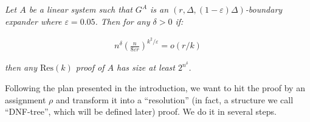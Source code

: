 \emph{Let $A$ be a linear system such that $G^{A}$ is an $(r,\Delta,(1-\varepsilon)\Delta)$-boundary
expander where $\varepsilon=0.05$. Then for any $\delta>0$ if:}\par


\[\begin{gathered}
n^{\delta}\left(\frac{n}{8\varepsilon r}\right)^{k^{2}/\varepsilon}=o(r/k)
\end{gathered}\]


\emph{then any $\mathrm{Res}(k)$ proof of $A$ has size at least $2^{n^{\delta}}$.}\par






Following the plan presented in the introduction, we want to hit the proof by an assignment $\rho$
and transform it into a “resolution” (in fact, a structure we call “DNF-tree”, which will be defined later) proof. We do it in several steps.\par



